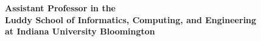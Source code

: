 \documentclass[12pt]{resume}
\begin{document}
\begin{center}
\textbf{Assistant Professor in the\\
Luddy School of Informatics, Computing, and Engineering\\
at Indiana University Bloomington}
\end{center}




\medskip


\end{document}

